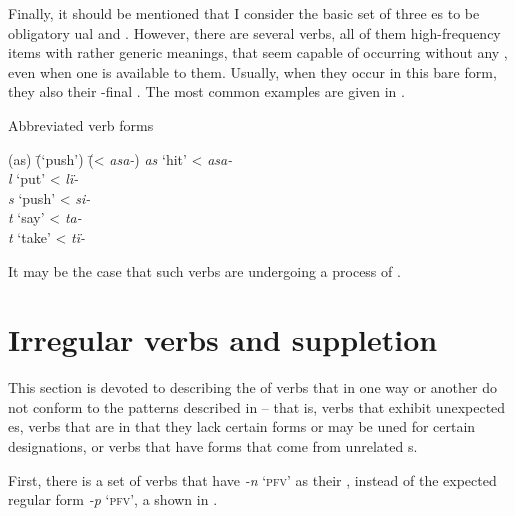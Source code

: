   Finally, it should be mentioned that I consider the basic set of three  es to be obligatory ual and  . However, there are several verbs, all of them high-frequency  items with rather generic meanings, that seem capable of occurring without any  , even when one is available to them. Usually, when they occur in this bare form, they also  their -final . The most common examples are given in .

\ea%
    \label{ex:verbs:9a}
            Abbreviated verb forms\\
\begin{tabbing}
{(as)} \= {(‘push’)} \= {(< \textit{asa-})}\kill
\textit{as} \> {‘hit’} \> {< \textit{asa-}}\\
\textit{l} \> {‘put’} \> {< \textit{lï-}}\\
\textit{s} \> {‘push’} \> {< \textit{si-}}\\
\textit{t} \> {‘say’} \> {< \textit{ta-}}\\
\textit{t} \> {‘take’} \> {< \textit{tï-}}
\end{tabbing}
 \z

It may be the case that such verbs are undergoing a process of .


\section{Irregular verbs and suppletion}\label{sec:4.3}


This section is devoted to describing the  of verbs that in one way or another do not conform to the patterns described in  -- that is, verbs that exhibit unexpected  es, verbs that are  in that they lack certain forms or may be uned for certain  designations, or verbs that have  forms that come from unrelated s.

  First, there is a set of verbs that have \textit{-n} ‘\textsc{pfv}’ as their  , instead of the expected regular form \textit{-p} ‘\textsc{pfv}’, a shown in .

